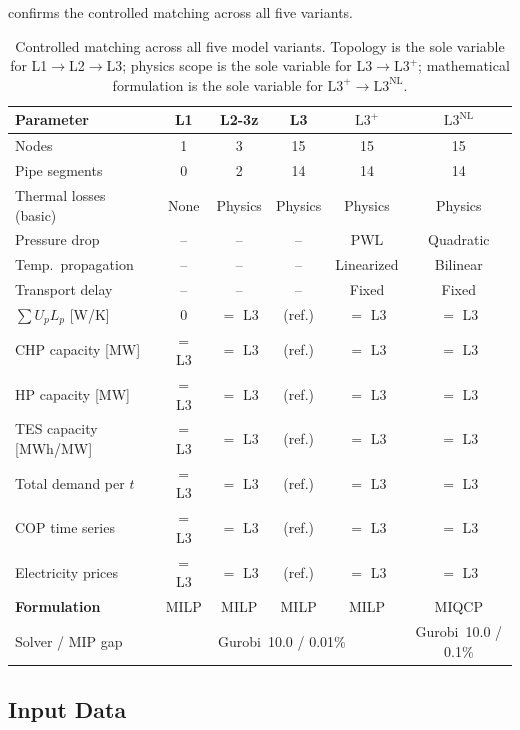 \documentclass[review,3p]{elsarticle}
\newcommand{\Lplus}{\mathrm{L3}^{+}}
\newcommand{\Lnl}{\mathrm{L3}^{\mathrm{NL}}}
\begin{document}
 confirms the controlled matching across all
five variants.

\begin{table}[htbp]
\centering
\caption{Controlled matching across all five model variants.
Topology is the sole variable for L1$\to$L2$\to$L3; physics scope
is the sole variable for L3$\to\Lplus$; mathematical formulation
is the sole variable for $\Lplus\to\Lnl$.}
\label{tab:matching}
\begin{tabular}{@{}lccccc@{}}
\toprule
Parameter & L1 & L2-3z & L3 & $\Lplus$ & $\Lnl$ \\
\midrule
Nodes                    & 1 & 3 & 15 & 15 & 15 \\
Pipe segments            & 0 & 2 & 14 & 14 & 14 \\
Thermal losses (basic)   & None & Physics & Physics & Physics
  & Physics \\
Pressure drop            & -- & -- & -- & PWL & Quadratic \\
Temp.\ propagation       & -- & -- & -- & Linearized & Bilinear \\
Transport delay          & -- & -- & -- & Fixed & Fixed \\
$\sum U_p L_p$ [W/K]    & 0 & $=$ L3 & (ref.) & $=$ L3 & $=$ L3 \\
CHP capacity [MW]        & $=$ L3 & $=$ L3 & (ref.) & $=$ L3
  & $=$ L3 \\
HP capacity [MW]         & $=$ L3 & $=$ L3 & (ref.) & $=$ L3
  & $=$ L3 \\
TES capacity [MWh/MW]    & $=$ L3 & $=$ L3 & (ref.) & $=$ L3
  & $=$ L3 \\
Total demand per $t$     & $=$ L3 & $=$ L3 & (ref.) & $=$ L3
  & $=$ L3 \\
COP time series          & $=$ L3 & $=$ L3 & (ref.) & $=$ L3
  & $=$ L3 \\
Electricity prices       & $=$ L3 & $=$ L3 & (ref.) & $=$ L3
  & $=$ L3 \\
\midrule
\textbf{Formulation}     & MILP & MILP & MILP & MILP & MIQCP \\
Solver / MIP gap
  & \multicolumn{4}{c}{Gurobi~10.0 / 0.01\%}
  & Gurobi~10.0 / 0.1\% \\
\bottomrule
\end{tabular}
\end{table}

\subsection{Input Data}
\label{sec:case_data}
\end{document}
